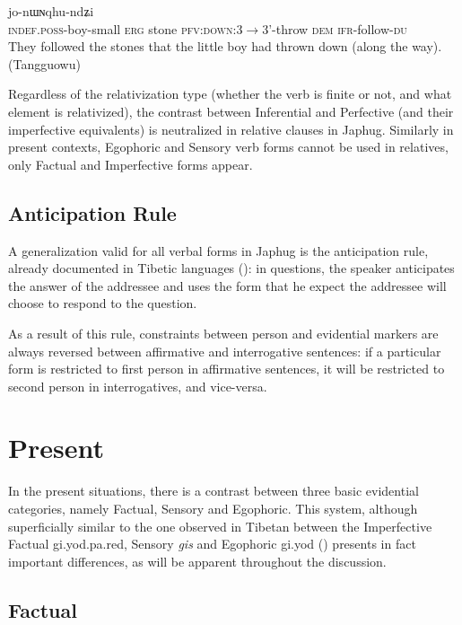 \documentclass[oldfontcommands,oneside,a4paper,11pt]{article}
\newcommand{\ipa}[1]{{\phon \mbox{#1}}} %
\begin{document}
\begin{exe}
\ex  \label{ex:paBde}
\gll  [\ipa{tɤ-tɕɯ-pɯ} 	\ipa{kɯ} 	\ipa{rdɤstaʁ} 	\ipa{pa-βde}] 	\ipa{nɯ} 	\ipa{jo-nɯɴqhu-ndʑi}  \\
\textsc{indef.poss}-boy-small \textsc{erg} stone \textsc{pfv:down}:3$\rightarrow$3'-throw \textsc{dem} \textsc{ifr}-follow-\textsc{du} \\
\glt They followed the stones that the little boy had thrown down (along the way). (Tangguowu)
\end{exe}

Regardless of the relativization type (whether the verb is finite or not, and what element is relativized), the contrast between Inferential and  Perfective (and their imperfective equivalents) is neutralized in relative clauses in Japhug. Similarly in present contexts, Egophoric and Sensory verb forms cannot be used in relatives, only Factual and Imperfective forms appear.

\subsection{Anticipation Rule} \label{sec:anticipation}
A generalization valid for all verbal forms in Japhug is the anticipation rule, already documented in Tibetic languages (\citealt[244]{tournadre14evidentiality}): in questions,  the speaker anticipates the answer of the addressee and uses the form that he expect the addressee will choose to respond to the question. 

As a result of this rule, constraints between person and evidential markers are always reversed between affirmative and interrogative sentences: if a particular form is restricted to first person in affirmative sentences, it will be restricted to second person in interrogatives, and vice-versa.

\section{Present} \label{sec:evd:prs}
In the present situations, there is a contrast between three basic evidential categories, namely Factual, Sensory and Egophoric. This system, although superficially similar to the one observed in Tibetan between the Imperfective Factual \ipa{gi.yod.pa.red}, Sensory \textit{gis} and Egophoric \ipa{gi.yod} (\citealt[295+]{tournadre08conjunct}) presents in fact important differences, as will be apparent throughout the discussion.

\subsection{Factual} \label{sec:fact}
\end{document}
